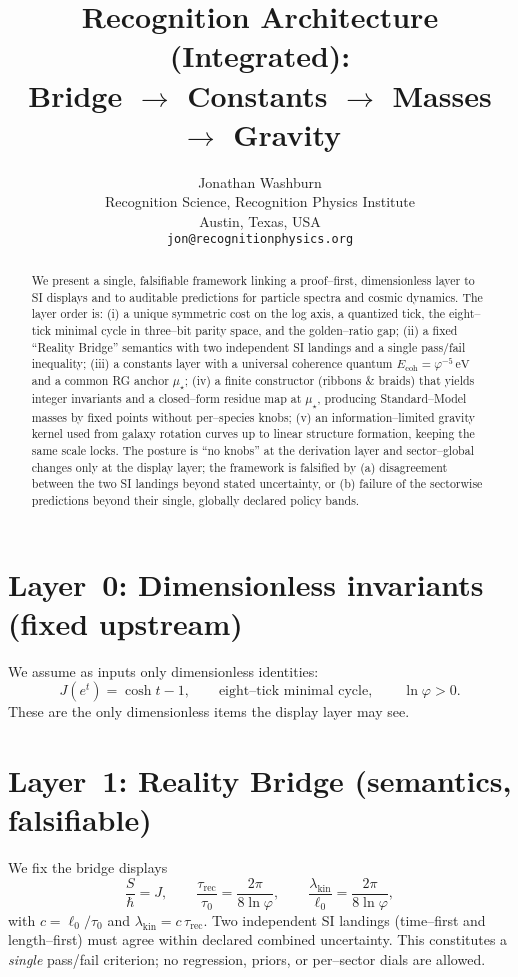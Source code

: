 \documentclass[11pt]{article}
\title{Recognition Architecture (Integrated):\\
Bridge $\rightarrow$ Constants $\rightarrow$ Masses $\rightarrow$ Gravity}
\author{Jonathan Washburn\\
Recognition Science, Recognition Physics Institute\\
Austin, Texas, USA\\
\texttt{jon@recognitionphysics.org}}
\date{} %
\begin{document}
\maketitle

\begin{abstract}
We present a single, falsifiable framework linking a proof--first, dimensionless layer to SI displays and to auditable predictions for particle spectra and cosmic dynamics. The layer order is: (i) a unique symmetric cost on the log axis, a quantized tick, the eight--tick minimal cycle in three--bit parity space, and the golden--ratio gap; (ii) a fixed ``Reality Bridge'' semantics with two independent SI landings and a single pass/fail inequality; (iii) a constants layer with a universal coherence quantum $E_{\mathrm{coh}}=\varphi^{-5}\,\mathrm{eV}$ and a common RG anchor $\mu_\star$; (iv) a finite constructor (ribbons $\&$ braids) that yields integer invariants and a closed--form residue map at $\mu_\star$, producing Standard--Model masses by fixed points without per--species knobs; (v) an information--limited gravity kernel used from galaxy rotation curves up to linear structure formation, keeping the same scale locks. The posture is ``no knobs'' at the derivation layer and sector--global changes only at the display layer; the framework is falsified by (a) disagreement between the two SI landings beyond stated uncertainty, or (b) failure of the sectorwise predictions beyond their single, globally declared policy bands.
\end{abstract}

\section*{Layer~0: Dimensionless invariants (fixed upstream)}
We assume as inputs only dimensionless identities:
\[
J(e^{t})=\cosh t-1,\qquad
\text{eight--tick minimal cycle},\qquad
\ln\varphi>0.
\]
These are the only dimensionless items the display layer may see.

\section*{Layer~1: Reality Bridge (semantics, falsifiable)}
We fix the bridge displays
\[
\frac{S}{\hbar}=J,\qquad
\frac{\tau_{\mathrm{rec}}}{\tau_{0}}=\frac{2\pi}{8\ln\varphi},\qquad
\frac{\lambda_{\mathrm{kin}}}{\ell_{0}}=\frac{2\pi}{8\ln\varphi},
\]
with $c=\ell_{0}/\tau_{0}$ and $\lambda_{\mathrm{kin}}=c\,\tau_{\mathrm{rec}}$. Two independent SI landings (time--first and length--first) must agree within declared combined uncertainty. This constitutes a \emph{single} pass/fail criterion; no regression, priors, or per--sector dials are allowed.
\end{document}
